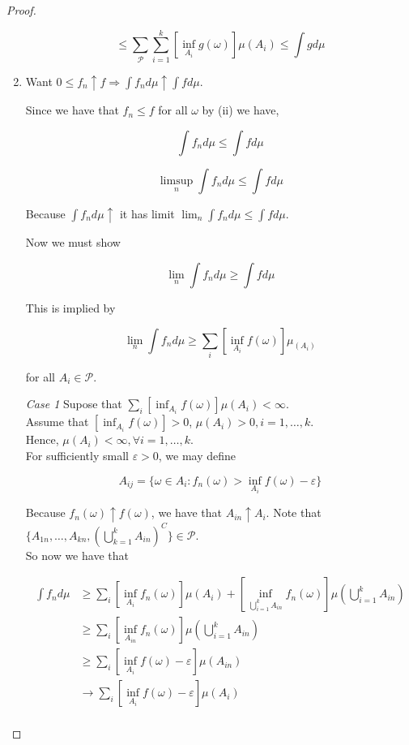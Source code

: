 \documentclass[11pt,fleqn]{book} %
\begin{document}
\begin{proof}
\begin{enumerate}
					$$\leq \sum_{\mathcal{P}} \sum^k_{i = 1} [\inf_{A_i} g(\omega)] \mu(A_i) \leq \int g d\mu$$

			\item Want $0 \leq f_n \uparrow f \Rightarrow \int f_n d\mu \uparrow \int f d\mu$.

			Since we have that $f_n \leq f$ for all $\omega$ by (ii) we have,

					$$\int f_n d\mu \leq \int f d\mu $$

					$$ \limsup_n \int f_n d\mu \leq \int f d\mu$$

			Because $\int f_n d\mu \uparrow$ it has limit $\lim_n \int f_n d\mu \leq \int f d\mu$. 

			Now we must show 

					$$\lim_n \int f_n d\mu \geq \int f d\mu $$

			This is implied by 

					$$\lim_n \int f_n d\mu \geq \sum_i [\inf_{A_i} f(\omega)] \mu_({A_i}) $$

			for all $A_i \in \mathcal{P}$. 


			\textit{Case 1} Supose that $\sum_i [\inf_{A_i} f(\omega)] \mu({A_i}) < \infty$.\\ 

					Assume that $[\inf_{A_i} f(\omega)] > 0$, $\mu({A_i}) > 0, i = 1, \dots, k$. \\

					Hence, $\mu(A_i) < \infty, \forall i = 1, \dots, k$. \\

					For sufficiently small $\varepsilon > 0$,  we may define

							$$A_{ij} = \{\omega \in A_i: f_n(\omega) > \inf_{A_i} f(\omega) - \varepsilon \}$$

					Because $f_n (\omega) \uparrow f(\omega)$, we have that $A_{in} \uparrow A_i$. Note that $\{A_{1n}, \dots, A_{kn}, (\bigcup^k_{k=1} A_{in})^C\} \in \mathcal{P}$.\\


					So now we have that

						\begin{align*}
							\int f_n d\mu &\geq \sum_i [\inf_{A_i} f_n(\omega)] \mu({A_i}) + [\inf_{\bigcup^k_{i=1} A_{in}} f_n(\omega)] \mu(\bigcup^k_{i=1} A_{in})\\	
								&\geq \sum_i [\inf_{A_{in}} f_n(\omega)] \mu(\bigcup^k_{i=1} A_{in})\\
								&\geq \sum_i [\inf_{A_{i}} f(\omega)- \varepsilon] \mu( A_{in})\\
								&\rightarrow \sum_i [\inf_{A_{i}} f(\omega) - \varepsilon] \mu(A_{i})\\
						\end{align*}


\end{enumerate}
\end{proof}
\end{document}
